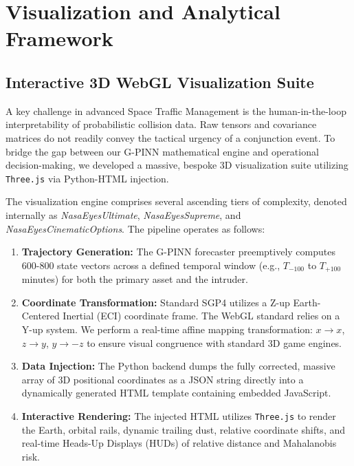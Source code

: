 \section{Visualization and Analytical Framework}

\subsection{Interactive 3D WebGL Visualization Suite}
A key challenge in advanced Space Traffic Management is the human-in-the-loop interpretability of probabilistic collision data. Raw tensors and covariance matrices do not readily convey the tactical urgency of a conjunction event. To bridge the gap between our G-PINN mathematical engine and operational decision-making, we developed a massive, bespoke 3D visualization suite utilizing \texttt{Three.js} via Python-HTML injection.

The visualization engine comprises several ascending tiers of complexity, denoted internally as \textit{NasaEyesUltimate}, \textit{NasaEyesSupreme}, and \textit{NasaEyesCinematicOptions}.
The pipeline operates as follows:
\begin{enumerate}
    \item \textbf{Trajectory Generation:} The G-PINN forecaster preemptively computes 600-800 state vectors across a defined temporal window (e.g., $T_{-100}$ to $T_{+100}$ minutes) for both the primary asset and the intruder.
    \item \textbf{Coordinate Transformation:} Standard SGP4 utilizes a Z-up Earth-Centered Inertial (ECI) coordinate frame. The WebGL standard relies on a Y-up system. We perform a real-time affine mapping transformation: $x \rightarrow x$, $z \rightarrow y$, $y \rightarrow -z$ to ensure visual congruence with standard 3D game engines.
    \item \textbf{Data Injection:} The Python backend dumps the fully corrected, massive array of 3D positional coordinates as a JSON string directly into a dynamically generated HTML template containing embedded JavaScript.
    \item \textbf{Interactive Rendering:} The injected HTML utilizes \texttt{Three.js} to render the Earth, orbital rails, dynamic trailing dust, relative coordinate shifts, and real-time Heads-Up Displays (HUDs) of relative distance and Mahalanobis risk.
\end{enumerate}

